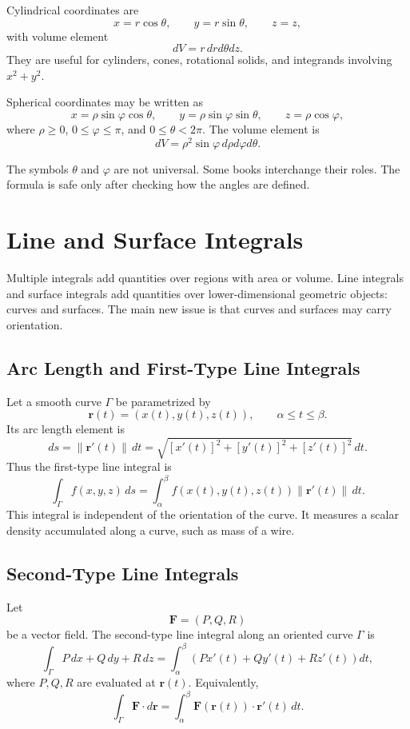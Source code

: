 Cylindrical coordinates are
\[
    x=r\cos\theta,
    \qquad
    y=r\sin\theta,
    \qquad
    z=z,
\]
with volume element
\[
    dV=r\,drd\theta dz.
\]
They are useful for cylinders, cones, rotational solids, and integrands involving $x^2+y^2$.

Spherical coordinates may be written as
\[
    x=\rho\sin\varphi\cos\theta,
    \qquad
    y=\rho\sin\varphi\sin\theta,
    \qquad
    z=\rho\cos\varphi,
\]
where $\rho\ge0$, $0\le\varphi\le\pi$, and $0\le\theta<2\pi$. The volume element is
\[
    dV=\rho^2\sin\varphi\,d\rho d\varphi d\theta.
\]

\begin{note}
The symbols $\theta$ and $\varphi$ are not universal. Some books interchange their roles. The formula is safe only after checking how the angles are defined.
\end{note}

\section{Line and Surface Integrals}

Multiple integrals add quantities over regions with area or volume. Line integrals and surface integrals add quantities over lower-dimensional geometric objects: curves and surfaces. The main new issue is that curves and surfaces may carry orientation.

\subsection{Arc Length and First-Type Line Integrals}

Let a smooth curve $\Gamma$ be parametrized by
\[
    \mathbf r(t)=(x(t),y(t),z(t)),
    \qquad
    \alpha\le t\le\beta.
\]
Its arc length element is
\[
    ds=\|\mathbf r'(t)\|\,dt
    =\sqrt{[x'(t)]^2+[y'(t)]^2+[z'(t)]^2}\,dt.
\]
Thus the first-type line integral is
\[
    \int_{\Gamma} f(x,y,z)\,ds
    =\int_{\alpha}^{\beta} f(x(t),y(t),z(t))\|\mathbf r'(t)\|\,dt.
\]
This integral is independent of the orientation of the curve. It measures a scalar density accumulated along a curve, such as mass of a wire.

\subsection{Second-Type Line Integrals}

Let
\[
    \mathbf F=(P,Q,R)
\]
be a vector field. The second-type line integral along an oriented curve $\Gamma$ is
\[
    \int_{\Gamma} P\,dx+Q\,dy+R\,dz
    =\int_{\alpha}^{\beta}
    \left(Px'(t)+Qy'(t)+Rz'(t)\right)dt,
\]
where $P,Q,R$ are evaluated at $\mathbf r(t)$. Equivalently,
\[
    \int_{\Gamma}\mathbf F\cdot d\mathbf r
    =\int_{\alpha}^{\beta}\mathbf F(\mathbf r(t))\cdot\mathbf r'(t)\,dt.
\]

